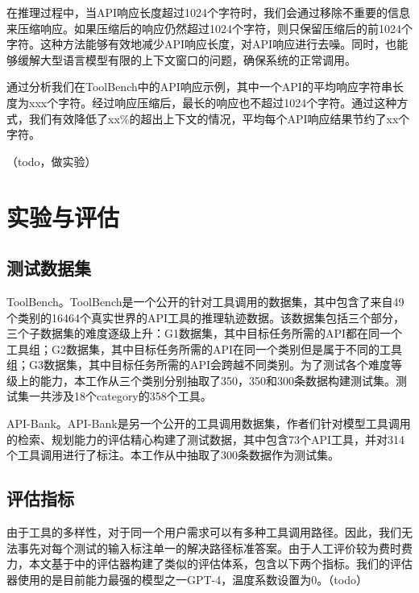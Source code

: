 在推理过程中，当API响应长度超过1024个字符时，我们会通过移除不重要的信息来压缩响应。如果压缩后的响应仍然超过1024个字符，则只保留压缩后的前1024个字符。这种方法能够有效地减少API响应长度，对API响应进行去噪。同时，也能够缓解大型语言模型有限的上下文窗口的问题，确保系统的正常调用。

通过分析我们在ToolBench中的API响应示例，其中一个API的平均响应字符串长度为xxx个字符。经过响应压缩后，最长的响应也不超过1024个字符。通过这种方式，我们有效降低了xx\%的超出上下文的情况，平均每个API响应结果节约了xx个字符。

（todo，做实验）

\section{实验与评估}
\subsection{测试数据集}
\label{subsec:test_dataset}

ToolBench。ToolBench\cite{Qin2023}是一个公开的针对工具调用的数据集，其中包含了来自49个类别的16464个真实世界的API工具的推理轨迹数据。该数据集包括三个部分，三个子数据集的难度逐级上升：G1数据集，其中目标任务所需的API都在同一个工具组；G2数据集，其中目标任务所需的API在同一个类别但是属于不同的工具组；G3数据集，其中目标任务所需的API会跨越不同类别。为了测试各个难度等级上的能力，本工作从三个类别分别抽取了350，350和300条数据构建测试集。测试集一共涉及18个category的358个工具。

API-Bank。API-Bank\cite{Li2023}是另一个公开的工具调用数据集，作者们针对模型工具调用的检索、规划能力的评估精心构建了测试数据，其中包含73个API工具，并对314个工具调用进行了标注。本工作从中抽取了300条数据作为测试集。

\subsection{评估指标}
由于工具的多样性，对于同一个用户需求可以有多种工具调用路径。因此，我们无法事先对每个测试的输入标注单一的解决路径标准答案。由于人工评价较为费时费力，本文基于\cite{Tang2023}中的评估器构建了类似的评估体系，包含以下两个指标。我们的评估器使用的是目前能力最强的模型之一GPT-4，温度系数设置为0。（todo）

